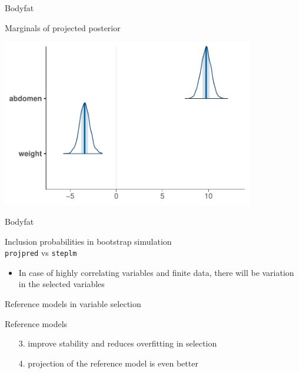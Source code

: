 \documentclass[english,t]{beamer}
\begin{document}
\begin{frame}{Bodyfat}

  \vspace{-0.55\baselineskip}
  Marginals of projected posterior
  
  \includegraphics[width=11cm]{bodyfat_proj_mcmc_areas.pdf}

\end{frame}

\begin{frame}{Bodyfat}

  \vspace{-0.55\baselineskip}
  Inclusion probabilities in bootstrap simulation\\
  \texttt{projpred} vs \texttt{steplm}


  \vspace{-1.5\baselineskip}
  \begin{itemize}
  \item<3> In case of highly correlating variables and finite data, there
    will be variation in the selected variables
  \end{itemize}

  
\end{frame}

\begin{frame}{Reference models in variable selection}

  Reference models
  \begin{itemize}
  \item[3.] improve stability and reduces overfitting in selection
  \item[4.] projection of the reference model is even better
  \end{itemize}

\end{frame}
\end{document}
